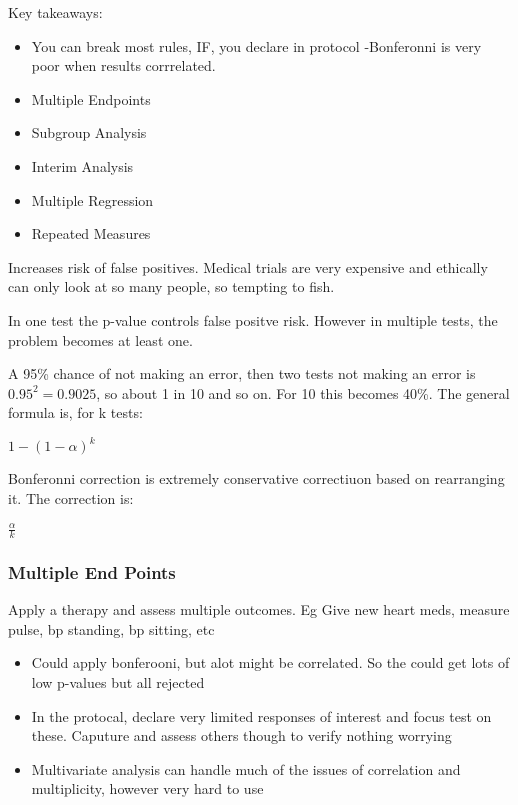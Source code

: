 \documentclass[
  letterpaper,
  DIV=11,
  numbers=noendperiod]{scrreprt}
\providecommand{\tightlist}{%
  \setlength{\itemsep}{0pt}\setlength{\parskip}{0pt}}\usepackage{longtable,booktabs,array}
\begin{document}
Key takeaways:

\begin{itemize}
\item
  You can break most rules, IF, you declare in protocol -Bonferonni is
  very poor when results corrrelated.
\item
  Multiple Endpoints
\item
  Subgroup Analysis
\item
  Interim Analysis
\item
  Multiple Regression
\item
  Repeated Measures
\end{itemize}

Increases risk of false positives. Medical trials are very expensive and
ethically can only look at so many people, so tempting to fish.

In one test the p-value controls false positve risk. However in multiple
tests, the problem becomes at least one.

A 95\% chance of not making an error, then two tests not making an error
is \(0.95^2 = 0.9025\), so about 1 in 10 and so on. For 10 this becomes
40\%. The general formula is, for k tests:

\(1-(1-\alpha)^k\)

Bonferonni correction is extremely conservative correctiuon based on
rearranging it. The correction is:

\(\frac{\alpha}{k}\)

\hypertarget{multiple-end-points}{%
\subsubsection{Multiple End Points}\label{multiple-end-points}}

Apply a therapy and assess multiple outcomes. Eg Give new heart meds,
measure pulse, bp standing, bp sitting, etc

\begin{itemize}
\tightlist
\item
  Could apply bonferooni, but alot might be correlated. So the could get
  lots of low p-values but all rejected
\item
  In the protocal, declare very limited responses of interest and focus
  test on these. Caputure and assess others though to verify nothing
  worrying
\item
  Multivariate analysis can handle much of the issues of correlation and
  multiplicity, however very hard to use
\end{itemize}
\end{document}
